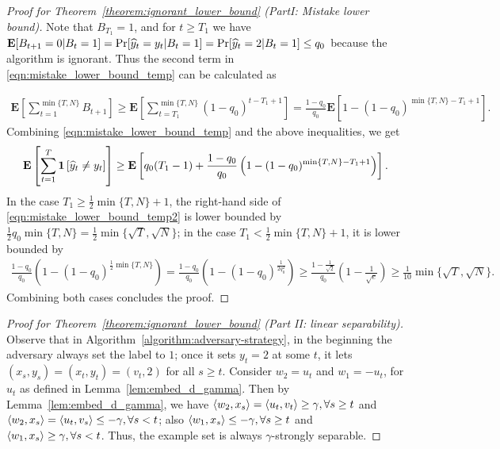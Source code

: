 \begin{proof}[Proof for Theorem~\ref{theorem:ignorant_lower_bound} (PartI: Mistake lower bound)]
Note that $B_{T_1}=1$, and for $t\geq T_1$ we have $\operatorname*{\mathbf{E}}[B_{t+1}=0|B_t=1]=\Pr[\widehat y_t=y_t|B_t=1]=\Pr[\widehat y_t=2|B_t=1]\leq q_0$ because the algorithm is ignorant. Thus the second term in \eqref{eqn:mistake_lower_bound_temp} can be calculated as

\begin{align*}
    \mathbf{E}\left[\sum_{t=1}^{\min\{T,N\}}B_{t+1}\right]\geq \mathbf{E}\left[\sum_{t=T_1}^{\min\{ T,N \}} (1-q_0)^{t-T_1+1} \right]
    = \frac{1-q_0}{q_0}\mathbf{E}\left[1-(1-q_0)^{\min\{T,N\}-T_1+1}\right]. 
\end{align*}
Combining \eqref{eqn:mistake_lower_bound_temp} and the above inequalities, we get
\begin{align}
    \mathbf{E}\left[\sum_{t=1}^T \mathbf{1}\left[\widehat y_t\neq y_t \right]\right]\geq \mathbf{E}\left[q_0(T_1-1)+\frac{1-q_0}{q_0}\left(1-(1-q_0)^{\min\{T,N\}-T_1+1}\right)\right]. \label{eqn:mistake_lower_bound_temp2}
\end{align}
In the case $T_1\geq \frac{1}{2}\min\{T,N\}+1$, the right-hand side of \eqref{eqn:mistake_lower_bound_temp2} is lower bounded by $\frac{1}{2}q_0\min\{T,N\}=\frac{1}{2}\min\{\sqrt{T}, \sqrt{N}\}$; in the case $T_1< \frac{1}{2}\min\{T,N\}+1$, it is lower bounded by 
\begin{align*}
    \frac{1-q_0}{q_0}\left(1-(1-q_0)^{\frac{1}{2}\min\{T,N\}}\right)= \frac{1-q_0}{q_0}\left(1-(1-q_0)^{\frac{1}{2q_0^2}}\right)\geq \frac{1-\frac{1}{\sqrt{2}}}{q_0}\left(1-\frac{1}{\sqrt{e}}\right)\geq \frac{1}{10}\min\{\sqrt{T}, \sqrt{N}\}.  
\end{align*}
Combining both cases concludes the proof. 
\end{proof}

\begin{proof}[Proof for Theorem~\ref{theorem:ignorant_lower_bound} (Part II: linear separability)]
Observe that in Algorithm~\ref{algorithm:adversary-strategy}, in the beginning the adversary always set the label to $1$; 
once it sets $y_t=2$ at some $t$, it lets $(x_s, y_s)=(x_t, y_t)=(v_t, 2)$ for all $s\geq t$. 
Consider $w_2=u_t$ and $w_1=-u_t$, for $u_t$ as defined in Lemma~\ref{lem:embed_d_gamma}. 
Then by Lemma~\ref{lem:embed_d_gamma}, we have $\left\langle w_2, x_s \right\rangle = \left\langle u_t, v_t \right\rangle \geq \gamma, \forall s \geq t$ 
and $\left\langle w_2, x_s \right\rangle = \left\langle u_t, v_s \right\rangle \leq - \gamma, \forall s< t$; 
also $\left\langle w_1, x_s \right\rangle \leq -\gamma, \forall s \geq t$ 
and $\left\langle w_1, x_s \right\rangle \geq  \gamma, \forall s<t$. 
Thus, the example set is always $\gamma$-strongly separable. 
\end{proof}
